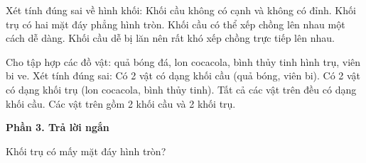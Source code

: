 \begin{ex} %
Xét tính đúng sai về hình khối:
\choiceTF
{\True Khối cầu không có cạnh và không có đỉnh.}
{\True Khối trụ có hai mặt đáy phẳng hình tròn.}
{Khối cầu có thể xếp chồng lên nhau một cách dễ dàng.}
{\True Khối cầu dễ bị lăn nên rất khó xếp chồng trực tiếp lên nhau.}
\end{ex}

\begin{ex} %
Cho tập hợp các đồ vật: quả bóng đá, lon cocacola, bình thủy tinh hình trụ, viên bi ve. Xét tính đúng sai:
\choiceTF
{\True Có 2 vật có dạng khối cầu (quả bóng, viên bi).}
{\True Có 2 vật có dạng khối trụ (lon cocacola, bình thủy tinh).}
{Tất cả các vật trên đều có dạng khối cầu.}
{\True Các vật trên gồm 2 khối cầu và 2 khối trụ.}
\end{ex}

\textbf{Phần 3. Trả lời ngắn}

\begin{ex} %
Khối trụ có mấy mặt đáy hình tròn?
\end{ex}

